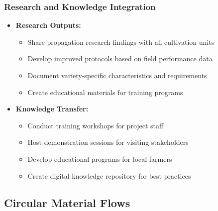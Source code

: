 \subsubsection{Research and Knowledge Integration}
\begin{itemize}
    \item \textbf{Research Outputs:}
    \begin{itemize}
        \item Share propagation research findings with all cultivation units
        \item Develop improved protocols based on field performance data
        \item Document variety-specific characteristics and requirements
        \item Create educational materials for training programs
    \end{itemize}
    
    \item \textbf{Knowledge Transfer:}
    \begin{itemize}
        \item Conduct training workshops for project staff
        \item Host demonstration sessions for visiting stakeholders
        \item Develop educational programs for local farmers
        \item Create digital knowledge repository for best practices
    \end{itemize}
\end{itemize}

\subsection{Circular Material Flows}

